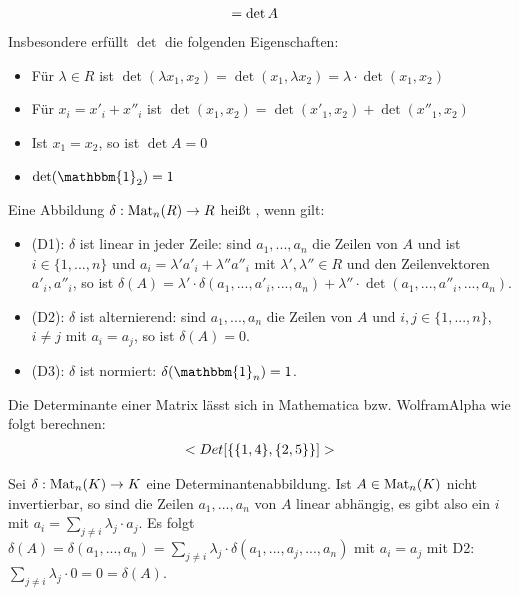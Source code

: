 \begin{remark}
\begin{align}
	&= \det A \notag
	\end{align}
	Insbesondere erfüllt $\det$ die folgenden Eigenschaften: 
	\begin{itemize}
		\item Für $\lambda\in R$ ist $\det(\lambda x_1,x_2)=\det(x_1,\lambda x_2)=\lambda\cdot \det(x_1,x_2)$
		\item Für $x_i=x'_i+x''_i$ ist $\det(x_1,x_2)=\det(x'_1,x_2) + \det(x''_1,x_2)$
		\item Ist $x_1=x_2$, so ist $\det A=0$
		\item $\det(\mathbbm{1}_2)=1$
	\end{itemize}
\end{remark}

\begin{definition}[Determinantenabbildung]
	Eine Abbildung $\delta:\Mat_n(R)\to R$ heißt , wenn gilt:
	\begin{itemize}
		\item (D1): $\delta$ ist linear in jeder Zeile: sind $a_1,...,a_n$ die Zeilen von $A$ und ist $i\in \{1,...,n\}$ und $a_i=\lambda'a'_i + 
		\lambda''a''_i$ mit $\lambda',\lambda''\in R$ und den Zeilenvektoren $a'_i,a''_i$, so ist $\delta(A)=\lambda'\cdot \delta(a_1,...,
		a'_i,...,a_n) + \lambda''\cdot \det(a_1,...,a''_i,...,a_n)$.
		\item (D2): $\delta$ ist alternierend: sind $a_1,...,a_n$ die Zeilen von $A$ und $i,j\in \{1,...,n\}$, $i\neq j$ mit $a_i=a_j$, so ist 
		$\delta(A)=0$.
		\item (D3): $\delta$ ist normiert: $\delta(\mathbbm{1}_n)=1$.
	\end{itemize}
\end{definition}

\begin{mathematica}[Determinante]
	Die Determinante einer Matrix lässt sich in Mathematica bzw. WolframAlpha wie folgt berechnen:
	\begin{align}
		\texttt{Det[\{\{1, 4\}, \{2, 5\}\}]}\notag
	\end{align}
\end{mathematica}

\begin{example}
	Sei $\delta:\Mat_n(K)\to K$ eine Determinantenabbildung. Ist $A\in \Mat_n(K)$ nicht invertierbar, so sind die Zeilen 
	$a_1,...,a_n$ von $A$ linear abhängig, es gibt also ein $i$ mit $a_i=\sum_{j\neq i} \lambda_j\cdot a_j$. Es folgt $\delta(A)=
	\delta(a_1,...,a_n)=\sum_{j\neq i} \lambda_j\cdot \delta(a_1,...,a_j,...,a_n)$ mit $a_i=a_j$ mit D2: $\sum_{j\neq i} 
	\lambda_j\cdot 0=0=\delta(A)$.
\end{example}

